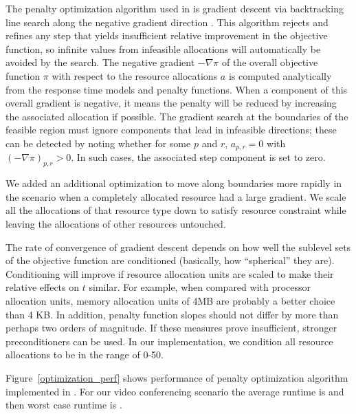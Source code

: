 The penalty optimization algorithm used in \pacora is gradient descent via backtracking line search along the negative gradient direction \cite{BoVa}.
This algorithm rejects and refines any step that yields insufficient relative improvement in the objective function,
so infinite values from infeasible allocations will automatically be avoided by the search.
The negative gradient $-\nabla\pi$ of the overall objective function $\pi$
with respect to the resource allocations $a$
is computed analytically from the response time models and penalty functions.
When a component of this overall gradient is negative,
it means the penalty will be reduced by increasing the associated allocation if possible.
The gradient search at the boundaries of the feasible region
must ignore components that lead in infeasible directions;
these can be detected by noting whether for some $p$ and $r$, $a_{p,r} = 0$ with $(-\nabla\pi)_{p,r} > 0$.
In such cases, the associated step component is set to zero.

We added an additional optimization to move along boundaries more rapidly in the scenario when a completely allocated resource had a large gradient.  We scale all the allocations of that resource type down to satisfy resource constraint while leaving the allocations of other resources untouched.

The rate of convergence of gradient descent depends on how well the sublevel sets of the objective function
are conditioned (basically, how ``spherical'' they are).
Conditioning will improve if resource allocation units are scaled to make their relative effects on $t$ similar.
For example, when compared with processor allocation units,
memory allocation units of 4MB are probably a better choice than 4 KB.
In addition, penalty function slopes should not differ by more than perhaps two orders of magnitude. If these measures prove insufficient, stronger preconditioners can be used. In our implementation, we condition all resource allocations to be in the range of 0-50.


\begin{figure*}[!t]
	\begin{center}	
		\caption{Performance of our penalty optimization algorithm}
		\label{optimization_perf}
	\end{center}
\end{figure*}

Figure~\ref{optimization_perf} shows performance of penalty optimization algorithm implemented in \tess.  For our video conferencing scenario the average runtime is  and then worst case runtime is .  
